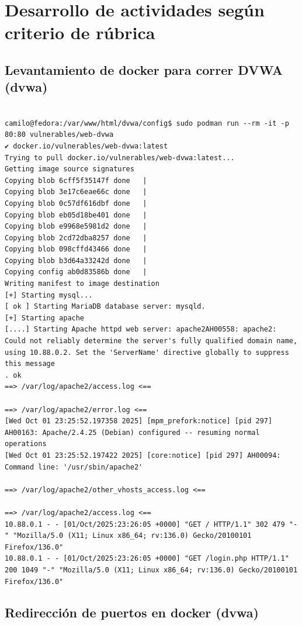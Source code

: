 \documentclass[letter,12pt]{article}
\begin{document}
\section{Desarrollo de actividades según criterio de rúbrica}

\subsection{Levantamiento de docker para correr DVWA (dvwa)}
\begin{verbatim}

camilo@fedora:/var/www/html/dvwa/config$ sudo podman run --rm -it -p 80:80 vulnerables/web-dvwa
✔ docker.io/vulnerables/web-dvwa:latest
Trying to pull docker.io/vulnerables/web-dvwa:latest...
Getting image source signatures
Copying blob 6cff5f35147f done   | 
Copying blob 3e17c6eae66c done   | 
Copying blob 0c57df616dbf done   | 
Copying blob eb05d18be401 done   | 
Copying blob e9968e5981d2 done   | 
Copying blob 2cd72dba8257 done   | 
Copying blob 098cffd43466 done   | 
Copying blob b3d64a33242d done   | 
Copying config ab0d83586b done   | 
Writing manifest to image destination
[+] Starting mysql...
[ ok ] Starting MariaDB database server: mysqld.
[+] Starting apache
[....] Starting Apache httpd web server: apache2AH00558: apache2: Could not reliably determine the server's fully qualified domain name, using 10.88.0.2. Set the 'ServerName' directive globally to suppress this message
. ok 
==> /var/log/apache2/access.log <==

==> /var/log/apache2/error.log <==
[Wed Oct 01 23:25:52.197358 2025] [mpm_prefork:notice] [pid 297] AH00163: Apache/2.4.25 (Debian) configured -- resuming normal operations
[Wed Oct 01 23:25:52.197422 2025] [core:notice] [pid 297] AH00094: Command line: '/usr/sbin/apache2'

==> /var/log/apache2/other_vhosts_access.log <==

==> /var/log/apache2/access.log <==
10.88.0.1 - - [01/Oct/2025:23:26:05 +0000] "GET / HTTP/1.1" 302 479 "-" "Mozilla/5.0 (X11; Linux x86_64; rv:136.0) Gecko/20100101 Firefox/136.0"
10.88.0.1 - - [01/Oct/2025:23:26:05 +0000] "GET /login.php HTTP/1.1" 200 1049 "-" "Mozilla/5.0 (X11; Linux x86_64; rv:136.0) Gecko/20100101 Firefox/136.0"

\end{verbatim}
\subsection{Redirección de puertos en docker (dvwa)}
\end{document}
